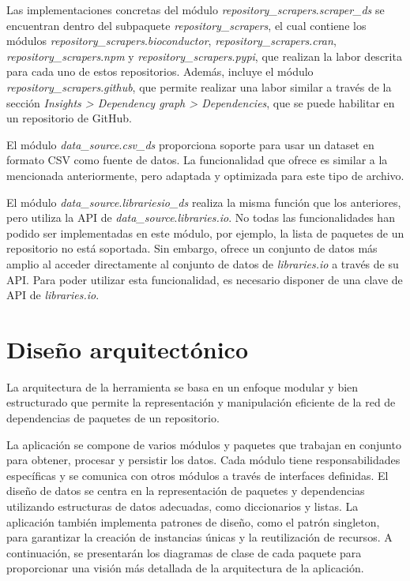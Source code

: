 Las implementaciones concretas del módulo \textit{repository\_scrapers}.\textit{scraper\_ds} se encuentran
dentro del subpaquete \textit{repository\_scrapers}, el cual contiene los módulos \textit{repository\_scrapers}.\textit{bioconductor},
\textit{repository\_scrapers}.\textit{cran}, \textit{repository\_scrapers}.\textit{npm}
y \textit{repository\_scrapers}.\textit{pypi}, que realizan la labor descrita para cada uno de
estos repositorios. Además, incluye el módulo \textit{repository\_scrapers}.\textit{github}, que permite
realizar una labor similar a través de la sección \textit{Insights > Dependency graph > Dependencies}, que se puede
habilitar en un repositorio de GitHub.

El módulo \textit{data\_source}.\textit{csv\_ds} proporciona soporte para usar un dataset en formato CSV como fuente de
datos. La funcionalidad que ofrece es similar a la mencionada anteriormente, pero adaptada y optimizada
para este tipo de archivo.

El módulo \textit{data\_source}.\textit{librariesio\_ds} realiza la misma función que los anteriores, pero utiliza la
API de \textit{data\_source}.\textit{libraries.io}. No todas las funcionalidades han podido ser implementadas en este
módulo, por ejemplo, la lista de paquetes de un repositorio no está soportada. Sin embargo, ofrece
un conjunto de datos más amplio al acceder directamente al conjunto de datos de \textit{libraries.io}
a través de su API. Para poder utilizar esta funcionalidad, es necesario disponer de una clave de API
de \textit{libraries.io}.

\section{Diseño arquitectónico}

La arquitectura de la herramienta se basa en un enfoque modular y bien estructurado que permite la
representación y manipulación eficiente de la red de dependencias de paquetes de un repositorio. 

La aplicación se compone de varios módulos y paquetes que trabajan en conjunto para obtener, procesar y persistir los datos.
Cada módulo tiene responsabilidades específicas y se comunica con otros módulos a través de interfaces definidas.
El diseño de datos se centra en la representación de paquetes y dependencias utilizando estructuras de datos
adecuadas, como diccionarios y listas. La aplicación también implementa patrones de diseño, como el patrón singleton,
para garantizar la creación de instancias únicas y la reutilización de recursos. A continuación, se presentarán
los diagramas de clase de cada paquete para proporcionar una visión más detallada de la arquitectura de
la aplicación.


